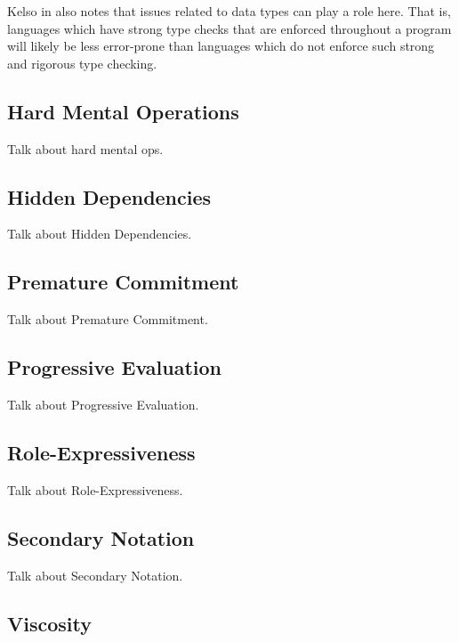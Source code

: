 Kelso in \cite{Kelso02} also notes that issues related to data types can play a role here.  That is, languages which have strong type checks that are enforced throughout a program will likely be less error-prone than languages which do not enforce such strong and rigorous type checking.

\subsection{Hard Mental Operations}
\label{hardmentalopsoutline}

Talk about hard mental ops.

\subsection{Hidden Dependencies}
\label{hiddendependenciesoutline}

Talk about Hidden Dependencies.

\subsection{Premature Commitment}
\label{prematurecommitmentoutline}

Talk about Premature Commitment.

\subsection{Progressive Evaluation}
\label{progressiveevaluationoutline}

Talk about Progressive Evaluation.

\subsection{Role-Expressiveness}
\label{roleexpressivenessoutline}

Talk about Role-Expressiveness.

\subsection{Secondary Notation}
\label{secondarynotationoutline}

Talk about Secondary Notation.

\subsection{Viscosity}
\label{viscosityoutline}


